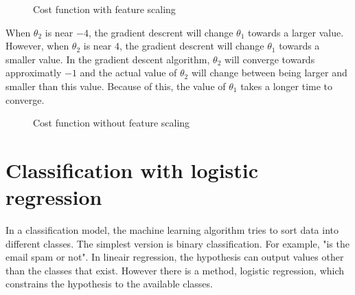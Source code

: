 \begin{figure}[H]
\centering
{}
\caption{Cost function with feature scaling} \label{fig:costwithscale}
\end{figure}

\noindent When $\theta_2$ is near $-4$, the gradient descrent will change $\theta_1$ towards a larger value. However, when $\theta_2$ is near $4$, the gradient descrent will change $\theta_1$ towards a smaller value. In the gradient descent algorithm, $\theta_2$ will converge towards approximatly $-1$ and the actual value of $\theta_2$ will change between being larger and smaller than this value. Because of this, the value of $\theta_1$ takes a longer time to converge.

\begin{figure}[H]
\centering
{}
\caption{Cost function without feature scaling} \label{fig:costwithoutscale}
\end{figure}

\section{Classification with logistic regression}
\label{classification}
In a classification model, the machine learning algorithm tries to sort data into different classes. The simplest version is binary classification. For example, "is the email spam or not". In lineair regression, the hypothesis can output values other than the classes that exist. However there is a method, logistic regression, which constrains the hypothesis to the available classes.

